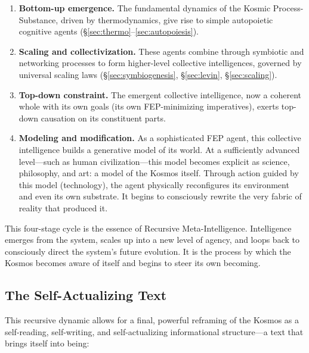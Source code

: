 \documentclass[12pt,a4paper]{article}
\begin{document}
\begin{enumerate}
    \item \textbf{Bottom-up emergence.} The fundamental dynamics of the
        Kosmic Process-Substance, driven by thermodynamics, give rise to
        simple autopoietic cognitive agents
        (\S\ref{sec:thermo}--\ref{sec:autopoiesis}).
    \item \textbf{Scaling and collectivization.} These agents combine
        through symbiotic and networking processes to form higher-level
        collective intelligences, governed by universal scaling laws
        (\S\ref{sec:symbiogenesis}, \S\ref{sec:levin}, \S\ref{sec:scaling}).
    \item \textbf{Top-down constraint.} The emergent collective
        intelligence, now a coherent whole with its own goals (its own
        FEP-minimizing imperatives), exerts top-down causation on its
        constituent parts.
    \item \textbf{Modeling and modification.} As a sophisticated FEP
        agent, this collective intelligence builds a generative model of
        its world.  At a sufficiently advanced level---such as human
        civilization---this model becomes explicit as science, philosophy,
        and art: a model of the Kosmos itself.  Through action guided by
        this model (technology), the agent physically reconfigures its
        environment and even its own substrate.  It begins to consciously
        rewrite the very fabric of reality that produced it.
\end{enumerate}

This four-stage cycle is the essence of Recursive Meta-Intelligence.
Intelligence emerges from the system, scales up into a new level of agency,
and loops back to consciously direct the system's future evolution.  It is
the process by which the Kosmos becomes aware of itself and begins to steer
its own becoming.

\subsection{The Self-Actualizing Text}
\label{sec:text}

This recursive dynamic allows for a final, powerful reframing of the Kosmos
as a self-reading, self-writing, and self-actualizing informational
structure---a text that brings itself into being:
\end{document}
